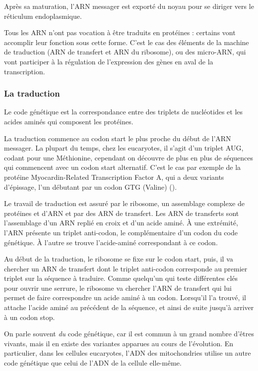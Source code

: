 Après sa maturation, l'ARN messager est exporté du noyau pour se diriger vers le réticulum endoplasmique.

Tous les ARN n'ont pas vocation à être traduits en protéines : certains vont accomplir leur fonction sous cette forme. C'est le cas des éléments de la machine de traduction (ARN de transfert et ARN du ribosome), ou des micro-ARN, qui vont participer à la régulation de l'expression des gènes en aval de la transcription.

\subsubsection{La traduction}

Le code génétique est la correspondance entre des triplets de nucléotides et les acides aminés qui composent les protéines. 

La traduction commence au codon start le plus proche du début de l'ARN messager. La plupart du temps, chez les eucaryotes, il s'agit d'un triplet AUG, codant pour une Méthionine, cependant on découvre de plus en plus de séquences qui commencent avec un codon start alternatif. C'est le cas par exemple de la protéine Myocardin-Related Transcription Factor A, qui a deux variants d'épissage, l'un débutant par un codon GTG (Valine) (\cite{scharenberg_tgf-_2014}).

Le travail de traduction est assuré par le ribosome, un assemblage complexe de protéines et d'ARN et par des ARN de transfert. Les ARN de transferts sont l'assemblage d'un ARN replié en croix et d'un acide aminé. À une extrémité, l'ARN présente un triplet anti-codon, le complémentaire d'un codon du code génétique. À l'autre se trouve l'acide-aminé correspondant à ce codon. 

Au début de la traduction, le ribosome se fixe sur le codon start, puis, il va chercher un ARN de transfert dont le triplet anti-codon corresponde au premier triplet sur la séquence à traduire. Comme quelqu'un qui teste différentes clés pour ouvrir une serrure, le ribosome va chercher l'ARN de transfert qui lui permet de faire correspondre un acide aminé à un codon. Lorsqu'il l'a trouvé, il attache l'acide aminé au précédent de la séquence, et ainsi de suite jusqu'à arriver à un codon stop. 

On parle souvent \emph{du} code génétique, car il est commun à un grand nombre d'êtres vivants, mais il en existe des variantes apparues au cours de l'évolution. En particulier, dans les cellules eucaryotes, l'ADN des mitochondries utilise un autre code génétique que celui de l'ADN de la cellule elle-même. 

